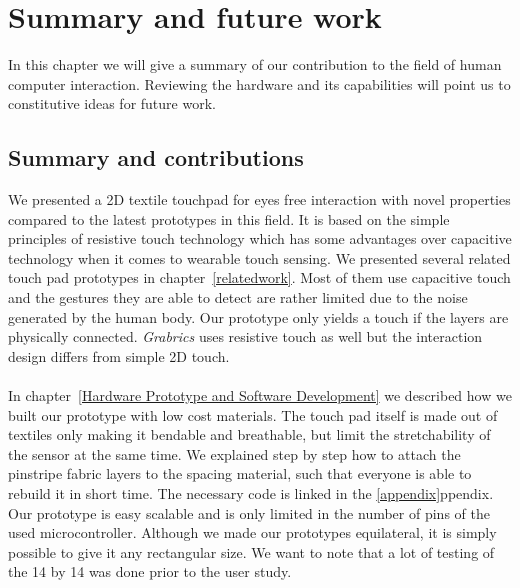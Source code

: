 %

\chapter{Summary and future work}
\label{summaryandfuturework}

In this chapter we will give a summary of our contribution to the field of human computer interaction. Reviewing the hardware and its capabilities will point us to constitutive ideas for future work.

\section{Summary and contributions}
\label{summaryandfuturework.summary}
We presented a 2D textile touchpad for eyes free interaction with novel properties compared to the latest prototypes in this field. It is based on the simple principles of resistive touch technology which has some advantages over capacitive technology when it comes to wearable touch sensing. We presented several related touch pad prototypes in chapter~\ref{relatedwork}. Most of them use capacitive touch and the gestures they are able to detect are rather limited due to the noise generated by the human body. Our prototype only yields a touch if the layers are physically connected. \emph{Grabrics} uses resistive touch as well but the interaction design differs from simple 2D touch. 
\\ \\
In chapter~\ref{Hardware Prototype and Software Development} we described how we built our prototype with low cost materials. The touch pad itself is made out of textiles only making it bendable and breathable, but limit the stretchability of the sensor at the same time. We explained step by step how to attach the pinstripe fabric layers to the spacing material, such that everyone is able to rebuild it in short time. The necessary code is linked in the \ref{appendix}ppendix. Our prototype is easy scalable and is only limited in the number of pins of the used microcontroller. Although we made our prototypes equilateral, it is simply possible to give it any rectangular size. We want to note that a lot of testing of the 14 by 14 was done prior to the user study. 
\\
